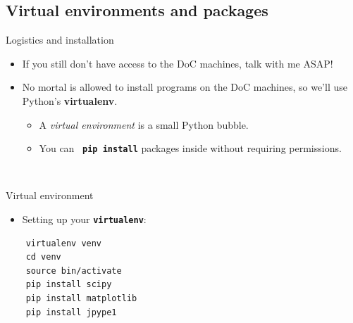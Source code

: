 \documentclass[xcolor=x11names, compress]{beamer}
\renewcommand{\(}{\begin{columns}}
\renewcommand{\)}{\end{columns}}
\newcommand{\<}[1]{\begin{column}{#1}}
\renewcommand{\>}{\end{column}}
\newcommand{\ver}[1]{\texttt{\textbf{#1}}}
\begin{document}
\subsection{Virtual environments and packages}
\begin{frame}{Logistics and installation}

  \large

  \vfill

  \begin{itemize}
     
    \item If you still don't have access to the DoC machines, talk with me ASAP!

  \vfill
  \pause

    \item No mortal is allowed to install programs on the DoC machines, so we'll
  use Python's \textbf{virtualenv}.

  \begin{itemize}
    \item A \emph{virtual environment} is a small Python bubble.
    \vspace{3pt}
    \item You can~ \ver{pip install} packages inside without requiring permissions.
  \end{itemize}

  \end{itemize}

  \vfill
  ~
  \vfill

\end{frame}

\begin{frame}[fragile]{Virtual environment}

  \begin{itemize}
    \item Setting up your \ver{virtualenv}:
  \end{itemize}

  \begin{verbatim}
    virtualenv venv
    cd venv
    source bin/activate
    pip install scipy
    pip install matplotlib
    pip install jpype1
  \end{verbatim}

\end{frame}
\end{document}
